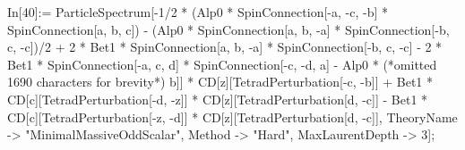 In[40]:= ParticleSpectrum[-1/2 * (Alp0 * SpinConnection[-a, -c, -b] * SpinConnection[a, b, c]) - (Alp0 * SpinConnection[a, b, -a] * SpinConnection[-b, c, -c])/2 + 2 * Bet1 * SpinConnection[a, b, -a] * SpinConnection[-b, c, -c] - 2 * Bet1 * SpinConnection[-a, c, d] * SpinConnection[-c, -d, a] - Alp0 * (*omitted 1690 characters for brevity*) b]] * CD[z][TetradPerturbation[-c, -b]] + Bet1 * CD[c][TetradPerturbation[-d, -z]] * CD[z][TetradPerturbation[d, -c]] - Bet1 * CD[c][TetradPerturbation[-z, -d]] * CD[z][TetradPerturbation[d, -c]], TheoryName -> "MinimalMassiveOddScalar", Method -> "Hard", MaxLaurentDepth -> 3];